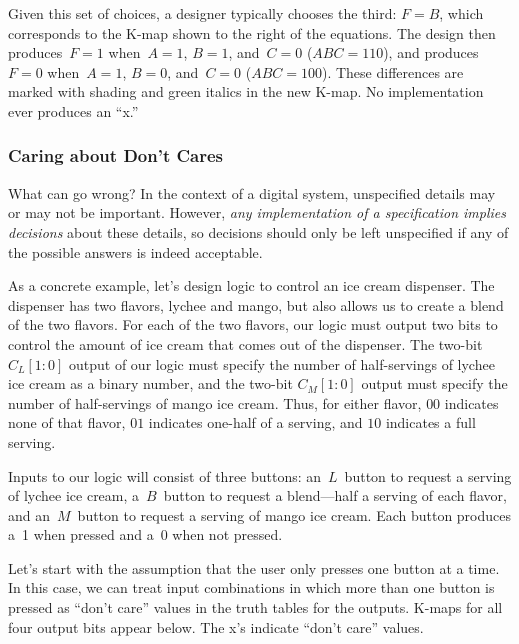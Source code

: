Given this set of choices, a designer typically chooses the third: $F=B$,
which corresponds to the \mbox{K-map} shown to the right of the 
equations.  The design then 
produces~$F=1$ when~$A=1$, $B=1$, and~$C=0$ ($ABC=110$), 
and produces~$F=0$ when~$A=1$, $B=0$, and~$C=0$ ($ABC=100$).
These differences are marked with shading and green italics in the new
\mbox{K-map}.  No implementation ever produces an ``x.''\\

\subsubsection{Caring about Don't Cares}

What can go wrong?
%
In the context of a digital system, unspecified details
may or may not be important.  However, {\em any implementation of 
a specification 
implies decisions} about these details, so decisions should only be left 
unspecified if any of the possible answers is indeed acceptable.

As a concrete example, let's design logic to control an ice cream 
dispenser.  The dispenser has two flavors, lychee and mango, but
also allows us to create a blend of the two flavors.
For each of the two flavors, our logic must output two bits
to control the amount of ice cream that comes out of the dispenser.
The two-bit $C_L[1:0]$ output of our logic must specify the number 
of half-servings of lychee ice cream as a binary number, and
the two-bit $C_M[1:0]$ output must specify the number of 
half-servings of mango ice cream.  Thus, for either flavor,
$00$ indicates none of that flavor,
$01$ indicates one-half of a serving, and 
$10$ indicates a full serving.

Inputs to our logic will consist of three buttons: an~$L$~button to
request a serving of lychee ice cream, a~$B$~button to request a
blend---half a serving of each flavor, and an~$M$~button to request
a serving of mango ice cream.  Each button produces a~1 
when pressed and a~0 when not pressed.

\pagebreak

Let's start with the assumption that the user only presses one button
at a time.  In this case, we can treat input combinations in which
more than one button is pressed as ``don't care'' values in the truth
tables for the outputs.  K-maps for all four output bits appear below.
The x's indicate ``don't care'' values.\\

\centerline{\hspace{.25in}\hspace{.25in}\hspace{.25in}}

